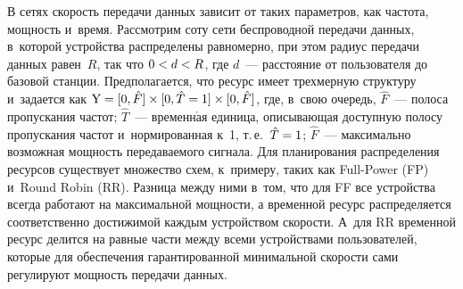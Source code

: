 \begin{multicols}{2}
\vspace*{-2pt}

  В сетях скорость передачи данных зависит от таких параметров, как частота, 
мощность и~время. Рассмотрим соту сети беспроводной передачи данных, 
в~которой устройства распределены равномерно, при этом радиус передачи 
данных равен~$R$, так что $0\hm< d\hm<R$, где $d$~--- расстояние от 
пользователя до базовой станции. Предполагается, что ресурс имеет 
трехмерную структуру и~задается как $\mathrm{Y}\hm= [0,\hat{F}]\times 
[0,\hat{T}=1] \times [0,\hat{F}]$, где, в~свою очередь, $\hat{F}$~--- полоса 
пропускания частот; $\hat{T}$~--- временн$\acute{\mbox{а}}$я единица, описывающая 
доступную полосу пропускания частот и~нормированная к~1, т.\,е.\ 
$\hat{T}\hm=1$; $\hat{F}$~--- максимально возможная мощность 
передаваемого сигнала. Для планирования распределения ресурсов существует 
множество схем, к~примеру, таких как Full-Power (FP) и~Round Robin (RR). 
Разница между ними в~том, что для FF все устройства всегда работают на 
максимальной мощности, а временной ресурс распределяется соответственно 
достижимой каждым устройством скорости. А~для RR временной ресурс 
делится на равные части между всеми устройствами пользователей, которые 
для обеспечения гарантированной минимальной скорости сами регулируют 
мощность передачи данных.
  

\end{multicols}
